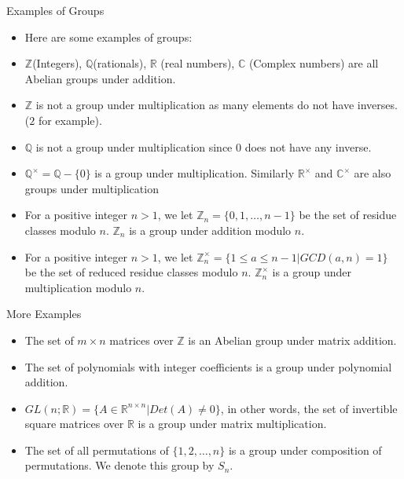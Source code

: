 \documentclass[ %
 10pt, xcolor={dvipsnames,svgnames,x11names,hyperref},
   hyperref={colorlinks=true,citecolor=green,linkcolor=DarkRed,urlcolor=ProcessBlue,anchorcolor=blue}
  ]{beamer}
\newenvironment{stepitemize}{\begin{itemize}[<+->]}{\end{itemize} }
\newcommand{\Z}{\mathbb{Z}}
\newcommand{\Q}{\mathbb{Q}}
\newcommand{\R}{\mathbb{R}}
\newcommand{\C}{\mathbb{C}}
\begin{document}
\begin{frame}{Examples of Groups}
\begin{stepitemize}
\item Here are some examples of groups:
\item $\Z$(Integers), $\Q$(rationals), $\R$ (real numbers), $\C$ (Complex numbers) are all Abelian groups under addition.
    \item $\Z$ is not a group under multiplication as many elements do not have inverses. ($2$ for example).
    \item $\Q$ is not a group under multiplication since $0$ does not have any inverse.
    \item $\Q^{\times} = \Q-\{0\}$ is a group under multiplication. Similarly $\R^{\times}$ and $\C^{\times}$ are also groups under multiplication
    \item For a positive integer $n>1$, we let $\Z_n = \{0,1, \dots, n-1\}$ be the set of residue classes modulo $n$. $\Z_n$ is a group under addition modulo $n$.
    \item For a positive integer $n>1$, we let $\Z_n^{\times} = \{1\leq a \leq n-1|GCD(a,n)=1\}$ be the set of reduced residue classes modulo $n$. $\Z_n^{\times}$ is a group under multiplication modulo $n$.

\end{stepitemize}
\end{frame}
\begin{frame}{More Examples}
  \begin{stepitemize}
    \item The set of $m\times n$ matrices over $\Z$ is an Abelian group under matrix addition.
    \item The set of polynomials with integer coefficients is a group under polynomial addition.
    \item $GL(n;\R) = \{A\in \R^{n\times n}|Det(A) \neq 0\}$, in other words, the set of invertible square matrices over $\R$ is a group under matrix multiplication.
    \item The set of all permutations of $\{1,2, \dots, n\}$ is a group under composition of permutations. We denote this group by $S_n$.

\end{stepitemize}
\end{frame}
\end{document}
